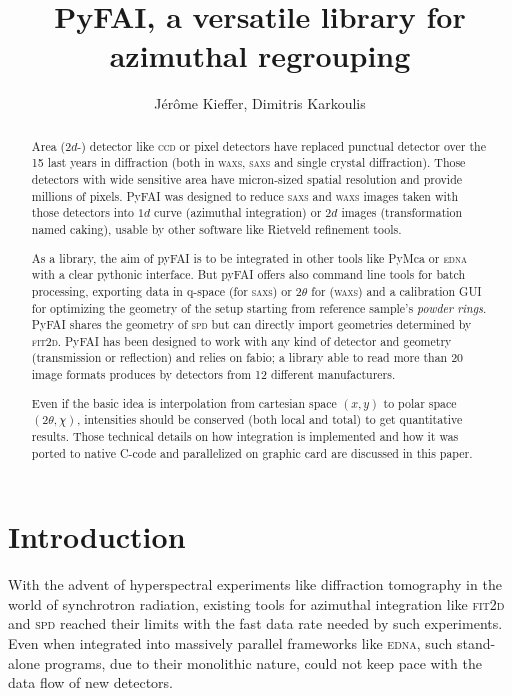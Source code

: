 \documentclass[a4paper]{jpconf}
\begin{document}
\title{PyFAI, a versatile library for azimuthal regrouping}

\author{J\'er\^ome Kieffer, Dimitris Karkoulis}

\address{European Synchrotron Radiation Facility; 6 rue Jules Horowitz;
38043 Grenoble; France}


\begin{abstract}
Area ($2d$-) detector like \textsc{ccd} or pixel detectors have replaced
punctual detector over the 15 last years in diffraction (both in \textsc{waxs}, \textsc{saxs} and single crystal
diffraction). Those detectors with wide sensitive area have micron-sized spatial
resolution and provide millions of pixels. PyFAI was designed to reduce \textsc{saxs} and
\textsc{waxs} images taken with those detectors into $1d$ curve (azimuthal integration)
or $2d$ images (transformation named caking), usable by other software like Rietveld
refinement tools.

As a library, the aim of pyFAI is to be integrated in other tools like
PyMca\cite{pymca} or \textsc{edna}\cite{edna} with a clear pythonic interface. But pyFAI
offers also command line tools for batch processing, exporting data in q-space (for \textsc{saxs}) or 2$\theta$ for
(\textsc{waxs}) and a calibration GUI for optimizing the geometry of the setup starting
from  reference sample's \textit{powder rings}.  PyFAI shares the geometry of
\textsc{spd}\cite{spd} but can directly import geometries determined by
\textsc{fit2d}\cite{fit2d1996}.
PyFAI has been designed to work with any kind of detector and geometry (transmission or reflection) and
relies on fabio\cite{fabio}; a library able to read more than 20 image formats
produces by  detectors from 12 different manufacturers.

Even if the basic idea is interpolation from cartesian space $(x,y)$ to polar
space $(2\theta, \chi )$, intensities should be conserved (both local and total)
to get quantitative results.  Those technical details on how integration is implemented
and how it was ported to native C-code and parallelized on graphic card are
discussed  in this paper.
\end{abstract}

\section{Introduction}

With the advent of hyperspectral experiments like diffraction tomography in the
world of synchrotron radiation, existing tools for azimuthal integration like
\textsc{fit2d}\cite{fit2d1996} and \textsc{spd}\cite{spd} reached their limits with the fast data rate
needed by such experiments. Even when integrated into massively parallel
frameworks like \textsc{edna}\cite{edna}, such stand-alone programs, due to their
monolithic nature, could not keep pace with the data flow of new detectors.
\end{document}
